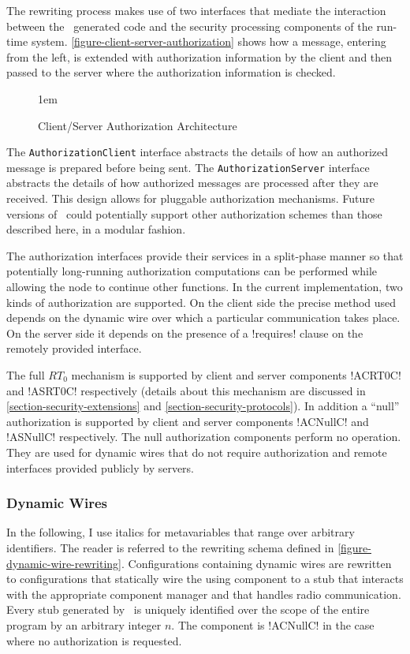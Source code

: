 The rewriting process makes use of two interfaces that mediate the interaction between the
\Sprocket\ generated code and the security processing components of the run-time system.
\autoref{figure-client-server-authorization} shows how a message, entering from the left, is
extended with authorization information by the client and then passed to the server where the
authorization information is checked.

\begin{figure}[htbp]
  
  \centerline{\raise 1em\box\graph}
  \caption{Client/Server Authorization Architecture}
  \label{figure-client-server-authorization}
\end{figure}

The \texttt{AuthorizationClient} interface abstracts the details of how an authorized message is
prepared before being sent. The \texttt{AuthorizationServer} interface abstracts the details of
how authorized messages are processed after they are received. This design allows for pluggable
authorization mechanisms. Future versions of \Sprocket\ could potentially support other
authorization schemes than those described here, in a modular fashion.

The authorization interfaces provide their services in a split-phase manner so that potentially
long-running authorization computations can be performed while allowing the node to continue
other functions. In the current implementation, two kinds of authorization are supported. On the
client side the precise method used depends on the dynamic wire over which a particular
communication takes place. On the server side it depends on the presence of a !requires! clause
on the remotely provided interface.

The full $RT_0$ mechanism is supported by client and server components !ACRT0C! and !ASRT0C!
respectively (details about this mechanism are discussed in
\autoref{section-security-extensions} and \autoref{section-security-protocols}). In addition a
``null'' authorization is supported by client and server components !ACNullC! and !ASNullC!
respectively. The null authorization components perform no operation. They are used for dynamic
wires that do not require authorization and remote interfaces provided publicly by servers.

\subsubsection{Dynamic Wires} In the following, I use italics for metavariables that range over
arbitrary identifiers. The reader is referred to the rewriting schema defined in
\autoref{figure-dynamic-wire-rewriting}. Configurations containing dynamic wires are rewritten
to configurations that statically wire the using component  to a stub
 that interacts with the appropriate component manager
 and that handles radio communication. Every stub generated by
\Sprocket\ is uniquely identified over the scope of the entire program by an arbitrary integer
$n$. The  component is !ACNullC! in the case where no authorization
is requested.

